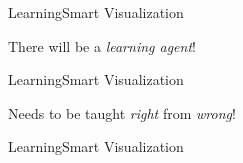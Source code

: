 \begin{frame}{Learning}{Smart Visualization}
  \begin{center}
      There will be a \textit{learning agent}!
  \end{center}
  \end{frame}

\begin{frame}{Learning}{Smart Visualization}
  \begin{center}
      Needs to be taught \textit{right} from \textit{wrong}!
  \end{center}
  \end{frame}

\begin{frame}{Learning}{Smart Visualization}
  \begin{center}
  \end{center}
  \end{frame}

